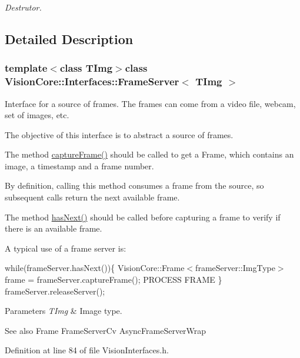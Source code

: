 \begin{DoxyCompactItemize}
\begin{DoxyCompactList}\small\item\em Destrutor. \end{DoxyCompactList}\end{DoxyCompactItemize}


\subsection{Detailed Description}
\subsubsection*{template$<$class T\+Img$>$class Vision\+Core\+::\+Interfaces\+::\+Frame\+Server$<$ T\+Img $>$}

Interface for a source of frames. The frames can come from a video file, webcam, set of images, etc. 

The objective of this interface is to abstract a source of frames.

The method \hyperlink{class_vision_core_1_1_interfaces_1_1_frame_server_a8d2ffbcea7c28182a48f32e86f830e12}{capture\+Frame()} should be called to get a Frame, which contains an image, a timestamp and a frame number.

By definition, calling this method consumes a frame from the source, so subsequent calls return the next available frame.

The method \hyperlink{class_vision_core_1_1_interfaces_1_1_frame_server_ac7d6b5c759a38e9e376f500f7155a679}{has\+Next()} should be called before capturing a frame to verify if there is an available frame.

A typical use of a frame server is\+:

while(frame\+Server.\+has\+Next())\{ Vision\+Core\+::\+Frame$<$frame\+Server\+::\+Img\+Type$>$ frame = frame\+Server.\+capture\+Frame(); P\+R\+O\+C\+E\+S\+S F\+R\+A\+M\+E \} frame\+Server.\+release\+Server();


\begin{DoxyParams}{Parameters}
{\em T\+Img} & Image type. \\
\hline
\end{DoxyParams}
\begin{DoxySeeAlso}{See also}
Frame Frame\+Server\+Cv Async\+Frame\+Server\+Wrap 
\end{DoxySeeAlso}


Definition at line 84 of file Vision\+Interfaces.\+h.



